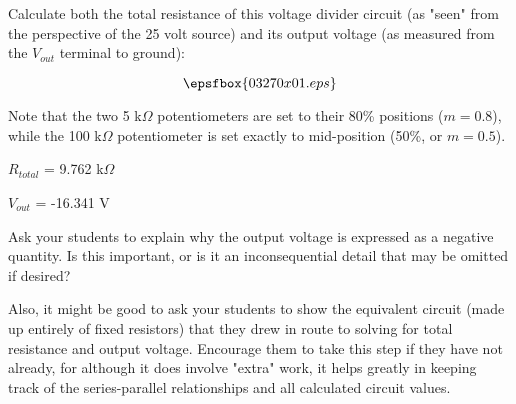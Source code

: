 

Calculate both the total resistance of this voltage divider circuit (as "seen" from the perspective of the 25 volt source) and its output voltage (as measured from the $V_{out}$ terminal to ground): 

$$\epsfbox{03270x01.eps}$$

Note that the two 5 k$\Omega$ potentiometers are set to their 80\% positions ($m = 0.8$), while the 100 k$\Omega$ potentiometer is set exactly to mid-position (50\%, or $m = 0.5$).







$R_{total}$ = 9.762 k$\Omega$

\vskip 10pt

$V_{out}$ = -16.341 V







Ask your students to explain why the output voltage is expressed as a negative quantity.  Is this important, or is it an inconsequential detail that may be omitted if desired?

Also, it might be good to ask your students to show the equivalent circuit (made up entirely of fixed resistors) that they drew in route to solving for total resistance and output voltage.  Encourage them to take this step if they have not already, for although it does involve "extra" work, it helps greatly in keeping track of the series-parallel relationships and all calculated circuit values.




